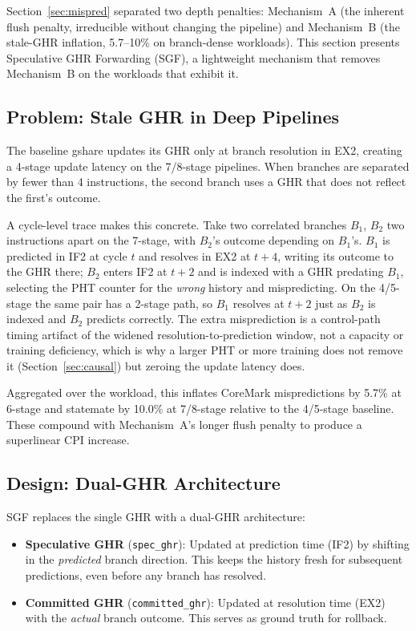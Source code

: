 \documentclass[acmsmall,nonacm,screen]{acmart}
\begin{document}
Section~\ref{sec:mispred} separated two depth penalties: Mechanism~A (the inherent flush penalty, irreducible without changing the pipeline) and Mechanism~B (the stale-GHR inflation, 5.7--10\% on branch-dense workloads).
This section presents Speculative GHR Forwarding (SGF), a lightweight mechanism that removes Mechanism~B on the workloads that exhibit it.

\subsection{Problem: Stale GHR in Deep Pipelines}
\label{sec:sgf_problem}

The baseline gshare updates its GHR only at branch resolution in EX2, creating a 4-stage update latency on the 7/8-stage pipelines.
When branches are separated by fewer than 4 instructions, the second branch uses a GHR that does not reflect the first's outcome.

A cycle-level trace makes this concrete. Take two correlated branches $B_1$, $B_2$ two instructions apart on the 7-stage, with $B_2$'s outcome depending on $B_1$'s. $B_1$ is predicted in IF2 at cycle $t$ and resolves in EX2 at $t{+}4$, writing its outcome to the GHR there; $B_2$ enters IF2 at $t{+}2$ and is indexed with a GHR predating $B_1$, selecting the PHT counter for the \emph{wrong} history and mispredicting. On the 4/5-stage the same pair has a 2-stage path, so $B_1$ resolves at $t{+}2$ just as $B_2$ is indexed and $B_2$ predicts correctly. The extra misprediction is a control-path timing artifact of the widened resolution-to-prediction window, not a capacity or training deficiency, which is why a larger PHT or more training does not remove it (Section~\ref{sec:causal}) but zeroing the update latency does.

Aggregated over the workload, this inflates CoreMark mispredictions by 5.7\% at 6-stage and statemate by 10.0\% at 7/8-stage relative to the 4/5-stage baseline. These compound with Mechanism~A's longer flush penalty to produce a superlinear CPI increase.

\subsection{Design: Dual-GHR Architecture}
\label{sec:sgf_design}

SGF replaces the single GHR with a dual-GHR architecture:
\begin{itemize}
\item \textbf{Speculative GHR} (\texttt{spec\_ghr}): Updated at prediction time (IF2) by shifting in the \emph{predicted} branch direction. This keeps the history fresh for subsequent predictions, even before any branch has resolved.
\item \textbf{Committed GHR} (\texttt{committed\_ghr}): Updated at resolution time (EX2) with the \emph{actual} branch outcome. This serves as ground truth for rollback.
\end{itemize}
\end{document}
